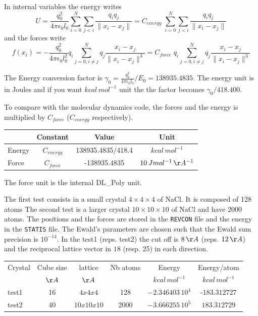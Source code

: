 \documentclass[12pt]{article} %
\begin{document}
 In internal variables the energy writes 
$$
U = \frac{q_0^2}{4 \pi\epsilon_0 l_0}\sum_{i=0}^{N}{\sum_{j<i}{\frac{q_i q_j}{\|x_i-x_j\|}}}  = C_{energy}  \;\sum_{i=0}^{N}{\sum_{j<i}{\frac{q_i q_j}{\|x_i-x_j\|}}}
$$
and the forces write 
$$
f(x_i) = -\frac{q_0^2}{4 \pi\epsilon_0 l_0^2} q_i \sum_{j=0,i\neq j}^{N}{q_j\frac{x_i-x_j}{\|x_i-x_j\|^3}}
 = C_{force} \; q_i  \sum_{j=0,i\neq j}^{N}{q_j\frac{x_i-x_j}{\|x_i-x_j\|^3}}
$$

The Energy conversion factor is $\displaystyle \gamma_0 = \frac{q_0^2}{4 \pi\epsilon_0 l_0}/E_0 = 138935.4835$. The energy unit is in Joules and if you want $kcal\, mol^{-1}$ unit the the factor becomes $\gamma_0/418.400$.


To compare with the molecular dynamics code, the forces and the energy is multiplied by $C_{force}$ ($C_{energy}$ respectively). 
\begin{center}
\begin{tabular}{|l|c|c|c|}
\hline
   & Constant & Value &  Unit \\
\hline
Energy & $C_{energy}$& 138935.4835/418.4 &  $kcal\, mol^{-1}$\\
Force &$C_{force}$& -138935.4835 &  $10\,J  mol^{-1}\, \AA^{-1}$\\
\hline
\end{tabular}
\end{center}
The force unit is the internal DL\_Poly unit.


The first test consists in a small crystal $4\times 4\times 4$ of NaCl. It is composed of 128 atoms The second test is a larger crystal  $10\times 10\times 10$ of NaCl and have 2000 atoms. The positions and the forces are stored in the \texttt{REVCON} file and the energy in the  \texttt{STATIS} file. The Ewald's parameters are chosen such that the  Ewald sum  precision is $10^{-14}$. In the test1 (reps. test2) the cut off is $8\, \AA$ (reps. $12\, \AA$) and the reciprocal lattice vector in $18$ (resp. 25) in each direction.
\begin{center}
\begin{tabular}{|l|c|c|c|c|c|}
\hline
Crystal  &Cube size & lattice & Nb atoms  &Energy  &Energy/atom\\
      &    $\AA$    & $\AA$    &     & $kcal\, mol^{-1}$ & $kcal\, mol^{-1}$\\
\hline
test1 & 16 & $4x4x4$ & 128 & $ -2.346403 \,10^{4}  $ & -$183.312727$\\
\hline
test2   & 40 &$10x10x10$  & 2000 & $-3.666255 \,10^{5} $ &$183.312729$\\
\hline
\end{tabular}
\end{center}
\end{document}
